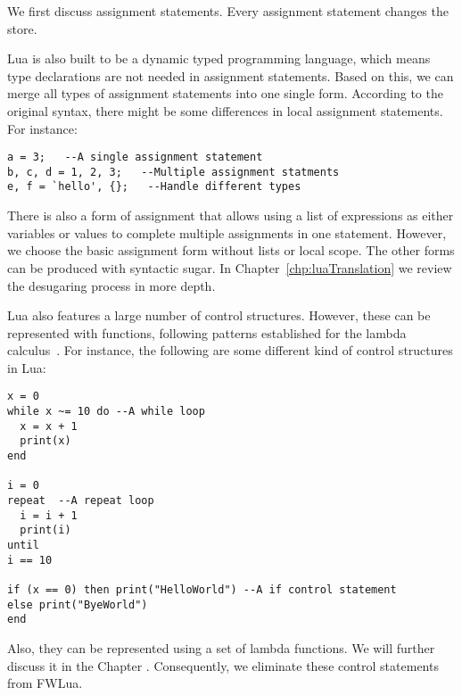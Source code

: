 We first discuss assignment statements.
Every assignment statement changes the store. 

Lua is also built to be a dynamic typed programming language, 
which means type declarations are not needed in assignment statements.
Based on this, we can merge all types of assignment statements into one single form. According to the original syntax, there might be some differences in local assignment statements.
For instance:

\begin{verbatim}
a = 3;   --A single assignment statement
b, c, d = 1, 2, 3;   --Multiple assignment statments
e, f = `hello', {};   --Handle different types
\end{verbatim}


There is also a form of assignment that allows using a list of expressions as either variables or values to complete multiple assignments in one statement. However, we choose the basic assignment form without lists or local scope.  The other forms can be produced with syntactic sugar.
In Chapter~\ref{chp:luaTranslation} we review the desugaring process in more depth.

Lua also features a large number of control structures.
However, these can be represented with functions,
following patterns established for the lambda calculus~\cite{TAPL}.
For instance, the following are some different kind of control structures in Lua:
\begin{verbatim}
x = 0
while x ~= 10 do --A while loop
  x = x + 1
  print(x)
end

i = 0
repeat  --A repeat loop
  i = i + 1
  print(i)
until
i == 10

if (x == 0) then print("HelloWorld") --A if control statement
else print("ByeWorld")
end
\end{verbatim}

Also, they can be represented using a set of lambda functions.
We will further discuss it in the Chapter \label{chp:luaTranslation}.
Consequently, we eliminate these control statements from FWLua.


